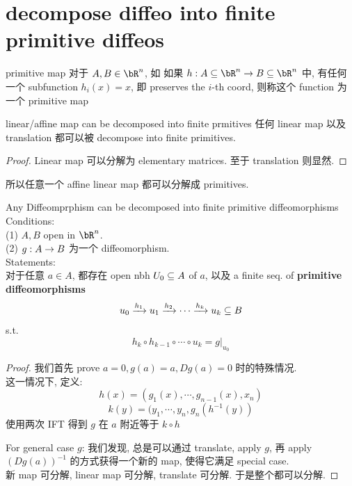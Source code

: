 \section{decompose diffeo into finite primitive diffeos}

\begin{definition}{primitive map}
对于 $A, B \in \bR^n$, 如
    如果 $h:A \sub\bR^n \rar B \sub\bR^n$ 中, 有任何一个 subfunction $h_i(x) = x$, 即 preserves the $i$-th coord, 则称这个 function 为一个 primitive map
\end{definition}


\begin{lemma}{linear/affine map can be decomposed into finite prmitives}
任何 linear map 以及 translation 都可以被 decompose into finite primitives.
\end{lemma}
\begin{proof}
    Linear map 可以分解为 elementary matrices.
    至于 translation 则显然.
\end{proof}
\begin{remark}
    所以任意一个 affine linear map 都可以分解成 primitives.
\end{remark}


\begin{theorem}{Any Diffeomprphism can be decomposed into finite primitive diffeomorphisms}
Conditions:\\
(1) $A, B$ open in $\bR^n$.\\
(2) $g:A \rightarrow B$ 为一个 diffeomorphism.\\
Statements:\\
对于任意 $a \in A$, 都存在 open nbh $U_0 \subseteq A$ of $a$, 以及 a finite seq. of \textbf{primitive diffeomorphisms}
$$
u_0 \xrightarrow{h_1} u_1 \xrightarrow{h_2} \cdots \xrightarrow{h_k} u_k \subseteq B
$$
s.t. 
$$
h_k \circ h_{k-1} \circ \cdots \circ u_k  = g |_{u_0}
$$
\end{theorem}
\begin{proof}
    我们首先 prove $a = 0, g(a) = a, Dg(a) = 0$ 时的特殊情况.\\
    这一情况下, 定义:
    $$
    h (x) = (g_1(x), \cdots, g_{n-1}(x), x_n)
    $$
    $$
    k(y) = (y_1, \cdots, y_n, g_n(h^{-1}(y))
    $$
    使用两次 IFT 得到 $g$ 在 $a$ 附近等于 $k \circ h$

    For general case $g$: 我们发现, 总是可以通过 translate, apply $g$, 再 apply $ (Dg(a))^{-1}$ 的方式获得一个新的 map, 使得它满足 special case.\\
    新 map 可分解, linear map 可分解, translate 可分解. 于是整个都可以分解.
\end{proof}




